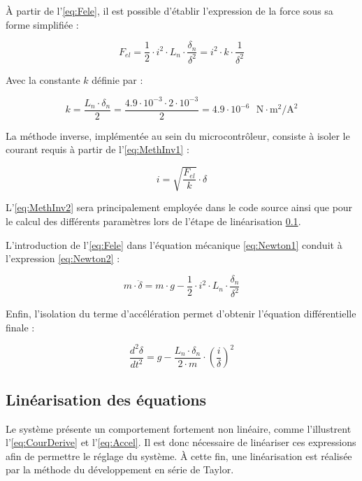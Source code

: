 À partir de l'\autoref{eq:Fele}, il est possible d'établir l'expression de la force sous sa forme simplifiée :

\begin{equation}
    F_{el} = \frac{1}{2} \cdot i^2 \cdot L_n \cdot \frac{\delta_n}{\delta^2} = i^2 \cdot k \cdot \frac{1}{\delta^2}
    \label{eq:MethInv1}
\end{equation}

Avec la constante $k$ définie par :

\begin{equation}
    k = \frac{L_n\cdot\delta_n}{2} = \frac{4.9\cdot 10^{-3}\cdot 2\cdot 10^{-3}}{2}=4.9\cdot 10^{-6} \text{ } \text{N}\cdot\text{m}^2/\text{A}^2
\end{equation}

La méthode inverse, implémentée au sein du microcontrôleur, consiste à isoler le courant requis à partir de l'\autoref{eq:MethInv1} :

\begin{equation}
    i = \sqrt{\frac{F_{el}}{k}} \cdot \delta
    \label{eq:MethInv2}
\end{equation}

L'\autoref{eq:MethInv2} sera principalement employée dans le code source ainsi que pour le calcul des différents paramètres lors de l'étape de linéarisation \ref{subsec:lin}.

L'introduction de l'\autoref{eq:Fele} dans l'équation mécanique \ref{eq:Newton1} conduit à l'expression \ref{eq:Newton2} :

\begin{equation}
    m \cdot \ddot{\delta} = m\cdot g - \frac{1}{2} \cdot i^2 \cdot L_n \cdot \frac{\delta_n}{\delta^2}
    \label{eq:Newton2}
\end{equation}

Enfin, l'isolation du terme d'accélération permet d'obtenir l'équation différentielle finale :

\begin{equation}
    \frac{d^2\delta}{dt^2} = g - \frac{L_n \cdot \delta_n}{2 \cdot m} \cdot \left(\frac{i}{\delta}\right)^2
    \label{eq:Accel}
\end{equation}

\subsection{Linéarisation des équations}
\label{subsec:lin}
Le système présente un comportement fortement non linéaire, comme l'illustrent l'\autoref{eq:CourDerive} et l'\autoref{eq:Accel}. Il est donc nécessaire de linéariser ces expressions afin de permettre le réglage du système. À cette fin, une linéarisation est réalisée par la méthode du développement en série de Taylor.\\

